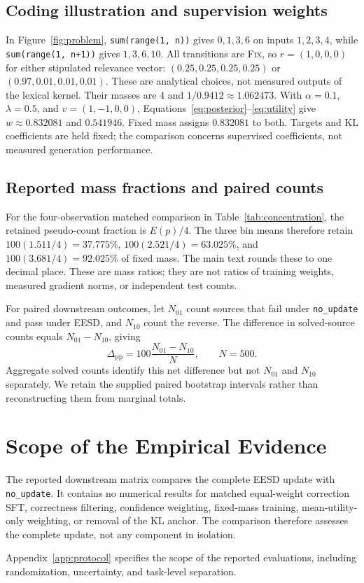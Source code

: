 \documentclass{article}
\newcommand{\method}{\textsc{EESD}\xspace}
\newcommand{\fix}{\textsc{Fix}\xspace}
\begin{document}
\subsection{Coding illustration and supervision weights}
\label{app:coding-illustration}
In Figure~\ref{fig:problem}, \texttt{sum(range(1, n))} gives $0,1,3,6$
on inputs $1,2,3,4$, while \texttt{sum(range(1, n+1))} gives
$1,3,6,10$. All transitions are \fix, so $r=(1,0,0,0)$ for either
stipulated relevance vector: $(0.25,0.25,0.25,0.25)$ or
$(0.97,0.01,0.01,0.01)$. These are analytical choices, not measured
outputs of the lexical kernel. Their masses are $4$ and
$1/0.9412\approx1.062473$. With $\alpha=0.1$, $\lambda=0.5$, and
$v=(1,-1,0,0)$, Equations~\ref{eq:posterior}--\ref{eq:utility} give
$w\approx0.832081$ and $0.541946$. Fixed mass assigns $0.832081$ to
both. Targets and KL coefficients are held fixed; the comparison
concerns supervised coefficients, not measured generation performance.

\subsection{Reported mass fractions and paired counts}


For the four-observation matched comparison in Table~\ref{tab:concentration},
the retained pseudo-count fraction is $E(p)/4$. The three bin means therefore
retain $100(1.511/4)=37.775\%$, $100(2.521/4)=63.025\%$, and
$100(3.681/4)=92.025\%$ of fixed mass. The main text rounds these to one
decimal place. These are mass ratios; they are not ratios of training
weights, measured gradient norms, or independent test counts.

For paired downstream outcomes, let $N_{01}$ count sources that fail under
\texttt{no\_update} and pass under \method, and $N_{10}$ count the reverse.
The difference in solved-source counts equals $N_{01}-N_{10}$, giving
\[
\Delta_{\mathrm{pp}}=100\frac{N_{01}-N_{10}}{N},\qquad N=500.
\]
Aggregate solved counts identify this net difference but not $N_{01}$ and
$N_{10}$ separately. We retain the supplied paired bootstrap intervals
rather than reconstructing them from marginal totals.

\section{Scope of the Empirical Evidence}
\label{app:future}

The reported downstream matrix compares the complete \method update with
\texttt{no\_update}. It contains no numerical results for matched equal-weight
correction SFT, correctness filtering, confidence weighting, fixed-mass
training, mean-utility-only weighting, or removal of the KL anchor. The
comparison therefore assesses the complete update, not any component in
isolation.

Appendix~\ref{app:protocol} specifies the scope of the reported
evaluations, including randomization, uncertainty, and task-level separation.
\end{document}
